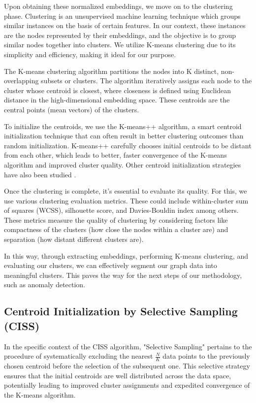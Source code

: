 \documentclass[10pt,twocolumn,a4paper]{article}
\begin{document}
Upon obtaining these normalized embeddings, we move on to the clustering phase. Clustering is an unsupervised machine learning technique which groups similar instances on the basis of certain features. In our context, these instances are the nodes represented by their embeddings, and the objective is to group similar nodes together into clusters. We utilize K-means clustering due to its simplicity and efficiency\cite{celebi2013comparative}, making it ideal for our purpose.

The K-means clustering algorithm partitions the nodes into K distinct, non-overlapping subsets or clusters. The algorithm iteratively assigns each node to the cluster whose centroid is closest, where closeness is defined using Euclidean distance in the high-dimensional embedding space. These centroids are the central points (mean vectors) of the clusters.

To initialize the centroids, we use the K-means++ algorithm, a smart centroid initialization technique that can often result in better clustering outcomes than random initialization. K-means++ carefully chooses initial centroids to be distant from each other, which leads to better, faster convergence of the K-means algorithm and improved cluster quality. Other centroid initialization strategies have also been studied \cite{muddana2019initialcentroids}.

Once the clustering is complete, it's essential to evaluate its quality. For this, we use various clustering evaluation metrics. These could include within-cluster sum of squares (WCSS), silhouette score, and Davies-Bouldin index among others. These metrics measure the quality of clustering by considering factors like compactness of the clusters (how close the nodes within a cluster are) and separation (how distant different clusters are).

In this way, through extracting embeddings, performing K-means clustering, and evaluating our clusters, we can effectively segment our graph data into meaningful clusters. This paves the way for the next steps of our methodology, such as anomaly detection.




\subsection{Centroid Initialization by Selective Sampling (CISS)}

In the specific context of the CISS algorithm, "Selective Sampling" pertains to the procedure of systematically excluding the nearest $\frac{N}{K}$ data points to the previously chosen centroid before the selection of the subsequent one. This selective strategy ensures that the initial centroids are well distributed across the data space, potentially leading to improved cluster assignments and expedited convergence of the K-means algorithm.
\end{document}

